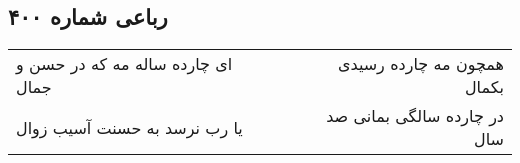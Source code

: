 \begin{center}
\section*{رباعی شماره ۴۰۰}
\label{sec:sh400}
\begin{longtable}{l p{0.5cm} r}
ای چارده ساله مه که در حسن و جمال
&&
همچون مه چارده رسیدی بکمال
\\
یا رب نرسد به حسنت آسیب زوال
&&
در چارده سالگی بمانی صد سال
\\
\end{longtable}
\end{center}
